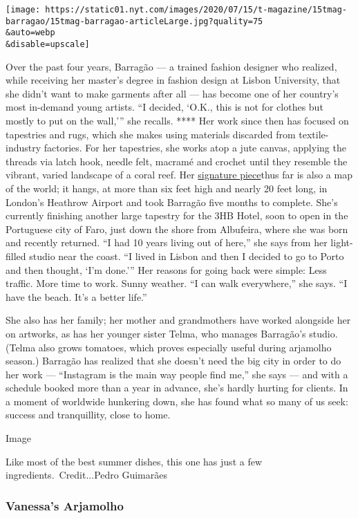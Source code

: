 \texttt{[image: https://static01.nyt.com/images/2020/07/15/t-magazine/15tmag-barragao/15tmag-barragao-articleLarge.jpg?quality=75\\\&auto=webp\\\&disable=upscale]}

Over the past four years, Barragão --- a trained fashion designer who
realized, while receiving her master's degree in fashion design at
Lisbon University, that she didn't want to make garments after all ---
has become one of her country's most in-demand young artists. ``I
decided, `O.K., this is not for clothes but mostly to put on the
wall,''' she recalls. **** Her work since then has focused on tapestries
and rugs, which she makes using materials discarded from
textile-industry factories. For her tapestries, she works atop a jute
canvas, applying the threads via latch hook, needle felt, macramé and
crochet until they resemble the vibrant, varied landscape of a coral
reef. Her
\href{https://www.thisiscolossal.com/2019/07/vanessa-barragao-world-tapestry/}{signature
piece}thus far is also a map of the world; it hangs, at more than six
feet high and nearly 20 feet long, in London's Heathrow Airport and took
Barragão five months to complete. She's currently finishing another
large tapestry for the 3HB Hotel, soon to open in the Portuguese city of
Faro, just down the shore from Albufeira, where she was born and
recently returned. ``I had 10 years living out of here,'' she says from
her light-filled studio near the coast. ``I lived in Lisbon and then I
decided to go to Porto and then thought, `I'm done.''' Her reasons for
going back were simple: Less traffic. More time to work. Sunny weather.
``I can walk everywhere,'' she says. ``I have the beach. It's a better
life.''

She also has her family; her mother and grandmothers have worked
alongside her on artworks, as has her younger sister Telma, who manages
Barragão's studio. (Telma also grows tomatoes, which proves especially
useful during arjamolho season.) Barragão has realized that she doesn't
need the big city in order to do her work --- ``Instagram is the main
way people find me,'' she says --- and with a schedule booked more than
a year in advance, she's hardly hurting for clients. In a moment of
worldwide hunkering down, she has found what so many of us seek: success
and tranquillity, close to home.

Image

Like most of the best summer dishes, this one has just a few
ingredients.~Credit...Pedro Guimarães

\hypertarget{vanessas-arjamolho}{%
\subsubsection{Vanessa's Arjamolho}\label{vanessas-arjamolho}}

